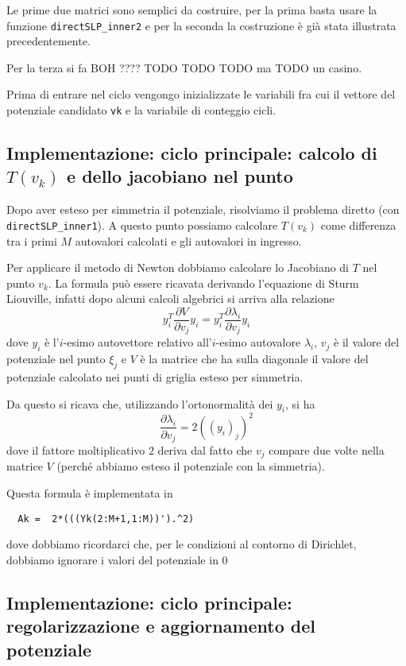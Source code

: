 \documentclass[a4paper,10pt]{article}
\theoremstyle{plain}
\theoremstyle{definition}
\theoremstyle{remark}
\newcommand{\der}[2]{\frac{\partial #1}{\partial #2}}
\begin{document}
Le prime due matrici sono semplici da costruire, per la prima basta
usare la funzione \lstinline{directSLP_inner2} e per la seconda la
  costruzione è già stata illustrata precedentemente.

Per la terza si fa BOH ???? TODO TODO TODO ma TODO un casino.

Prima di entrare nel ciclo vengongo inizializzate le variabili fra cui
il vettore del potenziale candidato \lstinline{vk} e la variabile di
conteggio cicli.


\subsection{Implementazione: ciclo principale: calcolo di $T(v_k)$ e dello jacobiano nel punto}

Dopo aver esteso per simmetria il potenziale, risolviamo il problema
diretto (con \lstinline{directSLP_inner1}). A questo punto possiamo
calcolare $T(v_k)$ come differenza tra i primi $M$ autovalori
calcolati e gli autovalori in ingresso.

Per applicare il metodo di Newton dobbiamo calcolare lo Jacobiano di
$T$ nel punto $v_k$. La formula può essere ricavata derivando
l'equazione di Sturm Liouville, infatti dopo alcuni calcoli algebrici
si arriva alla relazione
\begin{equation*}
  y_i ^T \der{V}{v_j} y_i = y_i ^T \der{\lambda _i}{v_j} y_i
\end{equation*}
dove $y_i$ è l'$i$-esimo autovettore relativo all'$i$-esimo autovalore
$\lambda _i$, $v_j$ è il valore del potenziale nel punto $\xi_j$ e $V$
è la matrice che ha sulla diagonale il valore del potenziale calcolato
nei punti di griglia esteso per simmetria.

Da questo si ricava che, utilizzando l'ortonormalità dei $y_i$, si ha
\begin{equation*}
  \der{\lambda _i}{v_j} = 2 ((y_i)_j) ^2
\end{equation*}
dove il fattore moltiplicativo $2$ deriva dal fatto che $v_j$ compare
due volte nella matrice $V$ (perché abbiamo esteso il potenziale con
la simmetria).

Questa formula è implementata in
\begin{lstlisting}
  Ak =  2*(((Yk(2:M+1,1:M))').^2)
\end{lstlisting}
dove dobbiamo ricordarci che, per le condizioni al contorno di
Dirichlet, dobbiamo ignorare i valori del potenziale in $0$

\subsection{Implementazione: ciclo principale: regolarizzazione e
  aggiornamento del potenziale}
\end{document}
